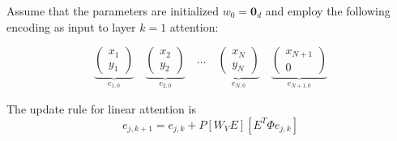 \documentclass[12pt]{extarticle}
\begin{document}
Assume that the parameters are initialized $w_0 = \mathbf{0}_d$ and employ the following encoding as input to layer $k = 1$ attention:

\[
\underbrace{\begin{pmatrix} x_1 \\ y_1 \end{pmatrix}}_{e_{1,0}} \quad
\underbrace{\begin{pmatrix} x_2 \\ y_2 \end{pmatrix}}_{e_{2,0}} \quad
\ldots \quad
\underbrace{\begin{pmatrix} x_N \\ y_N \end{pmatrix}}_{e_{N,0}} \quad
\underbrace{\begin{pmatrix} x_{N+1} \\ 0 \end{pmatrix}}_{e_{N+1,0}}
\]

The update rule for linear attention is
\[
e_{j,k+1} = e_{j,k} + P[W_V E][E^T \Phi e_{j,k}]
\]
\end{document}
